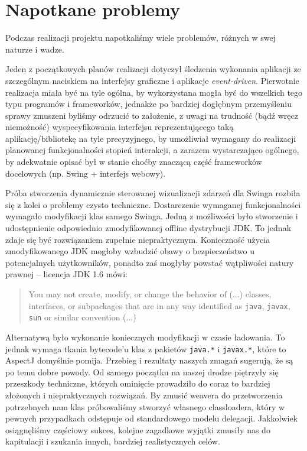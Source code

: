 \documentclass[12pt,a4paper,titlepage]{article}
\begin{document}
\section{Napotkane problemy}
  Podczas realizacji projektu napotkaliśmy wiele problemów, różnych w swej naturze i wadze.

    Jeden z początkowych planów realizacji dotyczył śledzenia wykonania aplikacji ze szczególnym naciskiem na interfejsy graficzne i aplikacje \textit{event-driven}. Pierwotnie realizacja miała być na tyle ogólna, by wykorzystana mogła być do wszelkich tego typu programów i frameworków, jednakże po bardziej dogłębnym przemyśleniu sprawy zmuszeni byliśmy odrzucić to założenie, z uwagi na trudność (bądź wręcz niemożność) wyspecyfikowania interfejsu reprezentującego taką aplikację/bibliotekę na tyle precyzyjnego, by umożliwiał wymagany do realizacji planowanej funkcjonalności stopień interakcji, a zarazem wystarczająco ogólnego, by adekwatnie opisać był w stanie choćby znaczącą część frameworków docelowych (np. Swing + interfejs webowy).

    Próba stworzenia dynamicznie sterowanej wizualizacji zdarzeń dla Swinga rozbiła się z kolei o problemy czysto techniczne. Dostarczenie wymaganej funkcjonalności wymagało modyfikacji klas samego Swinga. Jedną z możliwości było stworzenie i udostępnienie odpowiednio zmodyfikowanej offline dystrybucji JDK. To jednak zdaje się być rozwiązaniem zupełnie niepraktycznym. Konieczność użycia zmodyfikowanego JDK mogłoby wzbudzić obawy o bezpieczeństwo u potencjalnych użytkowników, ponadto zaś mogłyby powstać wątpliwości natury prawnej -- licencja JDK 1.6 mówi:

\begin{quote}
You may not  create,  modify,  or
change the behavior of (...) classes,  interfaces, or  subpackages  that
are in any  way  identified  as  \texttt{java},  \texttt{javax},  \texttt{sun}  or  similar
convention (...)
\end{quote}

Alternatywą było wykonanie koniecznych modyfikacji w czasie ładowania. To jednak wymaga tkania bytecode'u klas z pakietów \texttt{java.*} i \texttt{javax.*}, które to AspectJ domyślnie pomija. Przebieg i rezultaty naszych zmagań sugerują, że są po temu dobre powody. Od samego początku na naszej drodze piętrzyły się przeszkody techniczne, których ominięcie prowadziło do coraz to bardziej złożonych i niepraktycznych rozwiązań. By zmusić weavera do przetworzenia potrzebnych nam klas próbowaliśmy stworzyć własnego classloadera, który w pewnych przypadkach odstępuje od standardowego modelu delegacji. Jakkolwiek osiągnęliśmy częściowy sukces, kolejne zagadkowe wyjątki zmusiły nas do kapitulacji i szukania innych, bardziej realistycznych celów.
\end{document}
